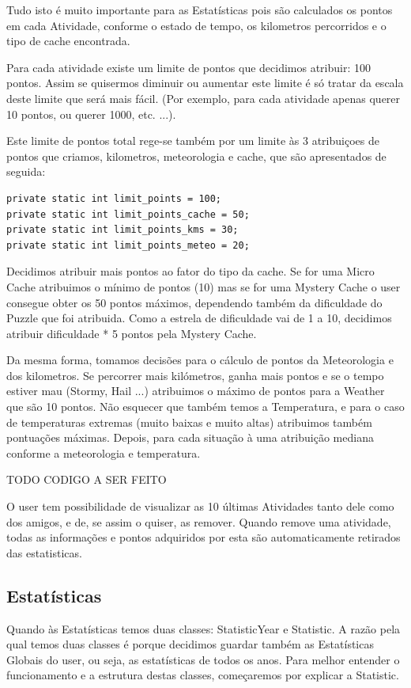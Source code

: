 \documentclass{article}
\begin{document}
\par Tudo isto é muito importante para as Estatísticas pois são calculados os pontos em cada Atividade, conforme o estado de tempo, os kilometros percorridos e o tipo de cache encontrada. 
\par Para cada atividade existe um limite de pontos que decidimos atribuir: 100 pontos. Assim se quisermos diminuir ou aumentar este limite é só tratar da escala deste limite que será mais fácil. (Por exemplo, para cada atividade apenas querer 10 pontos, ou querer 1000, etc. ...).
\par Este limite de pontos total rege-se também por um limite às 3 atribuiçoes de pontos que criamos,  kilometros, meteorologia e cache, que são apresentados de seguida:
\begin{lstlisting}
private static int limit_points = 100;
private static int limit_points_cache = 50;
private static int limit_points_kms = 30;
private static int limit_points_meteo = 20;
\end{lstlisting}

\par * Decidimos atribuir mais pontos ao fator do tipo da cache. Se for uma Micro Cache atribuimos o mínimo de pontos (10) mas se for uma Mystery Cache o user consegue obter os 50 pontos máximos, dependendo também da dificuldade do Puzzle que foi atribuida. Como a estrela de dificuldade vai de 1 a 10, decidimos atribuir dificuldade * 5 pontos pela Mystery Cache.
\par Da mesma forma, tomamos decisões para o cálculo de pontos da Meteorologia e dos kilometros. Se percorrer mais kilómetros, ganha mais pontos e se o tempo estiver mau (Stormy, Hail ...) atribuimos o máximo de pontos para a Weather que são 10 pontos. Não esquecer que também temos a Temperatura, e para o caso de temperaturas extremas (muito baixas e muito altas) atribuimos também pontuações máximas. Depois, para cada situação à uma atribuição mediana conforme a meteorologia e temperatura.

TODO CODIGO A SER FEITO
\par O user tem possibilidade de visualizar as 10 últimas Atividades tanto dele como dos amigos, e de, se assim o quiser, as remover. Quando remove uma atividade, todas as informações e pontos adquiridos por esta são automaticamente retirados das estatisticas.


\subsection{Estatísticas}
\quad Quando às Estatísticas temos duas classes: StatisticYear e Statistic.
A razão pela qual temos duas classes é porque decidimos guardar também as Estatísticas Globais do user, ou seja, as estatísticas de todos os anos. Para melhor entender o funcionamento e a estrutura destas classes, começaremos por explicar a Statistic.
\end{document}
